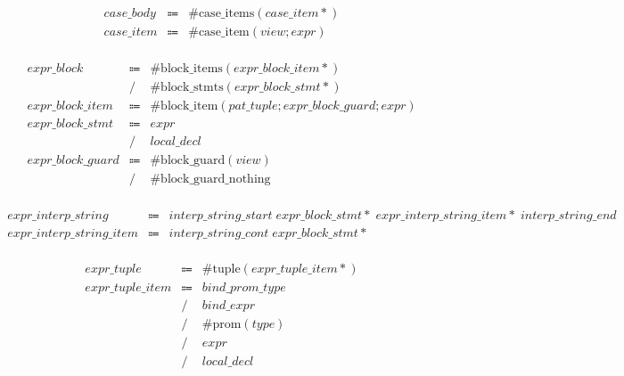 \begin{align*}
    \begin{array}{rcll}
        \mathit{case\_body}
        &\Coloneq &\mathrm{\#case\_items}(\mathit{case\_item}{*}) \\
        \mathit{case\_item}
        &\Coloneq &\mathrm{\#case\_item}(\mathit{view}; \mathit{expr})
    \end{array}
\end{align*}

\begin{align*}
    \begin{array}{rcll}
        \mathit{expr\_block}
        &\Coloneq &\mathrm{\#block\_items}(\mathit{expr\_block\_item}{*}) \\
        &\mathrel{/} &\mathrm{\#block\_stmts}(\mathit{expr\_block\_stmt}{*}) \\
        \mathit{expr\_block\_item}
        &\Coloneq &\mathrm{\#block\_item}(\mathit{pat\_tuple}; \mathit{expr\_block\_guard}; \mathit{expr}) \\
        \mathit{expr\_block\_stmt}
        &\Coloneq &\mathit{expr} \\
        &\mathrel{/} &\mathit{local\_decl} \\
        \mathit{expr\_block\_guard}
        &\Coloneq &\mathrm{\#block\_guard}(\mathit{view}) \\
        &\mathrel{/} &\mathrm{\#block\_guard\_nothing}
    \end{array}
\end{align*}

\begin{align*}
    \begin{array}{rcll}
        \mathit{expr\_interp\_string}
        &\Coloneq &\mathit{interp\_string\_start}\; \mathit{expr\_block\_stmt}{*}\; \mathit{expr\_interp\_string\_item}{*}\; \mathit{interp\_string\_end} \\
        \mathit{expr\_interp\_string\_item}
        &\Coloneq &\mathit{interp\_string\_cont}\; \mathit{expr\_block\_stmt}{*}
    \end{array}
\end{align*}

\begin{align*}
    \begin{array}{rcll}
        \mathit{expr\_tuple}
        &\Coloneq &\mathrm{\#tuple}(\mathit{expr\_tuple\_item}{*}) \\
        \mathit{expr\_tuple\_item}
        &\Coloneq &\mathit{bind\_prom\_type} \\
        &\mathrel{/} &\mathit{bind\_expr} \\
        &\mathrel{/} &\mathrm{\#prom}(\mathit{type}) \\
        &\mathrel{/} &\mathit{expr} \\
        &\mathrel{/} &\mathit{local\_decl}
    \end{array}
\end{align*}

